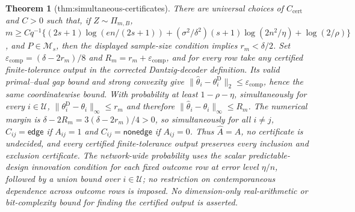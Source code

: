 \documentclass{article}
\newtheorem{theorem}{Theorem}
\begin{document}
\begin{theorem}[thm:simultaneous-certificates]\label{thm:simultaneous-certificates}
There are universal choices of \(C_{\mathrm{cert}}\) and \(C>0\) such that, if \(Z\sim\Pi_{m,B}\), \(m\ge Cq^{-1}\{(2s+1)\log(en/(2s+1))+(\sigma^2/\delta^2)(s+1)\log(2n^2/\eta)+\log(2/\rho)\}\), and \(P\in\mathcal M_s\), then the displayed sample-size condition implies \(r_m<\delta/2\). Set \(\varepsilon_{\mathrm{comp}}=(\delta-2r_m)/8\) and \(R_m=r_m+\varepsilon_{\mathrm{comp}}\), and for every row take any certified finite-tolerance output in the corrected Dantzig-decoder definition. Its valid primal--dual gap bound and strong convexity give \(\lVert\widehat\theta_i-\theta_i^{\mathrm D}\rVert_2\le\varepsilon_{\mathrm{comp}}\), hence the same coordinatewise bound. With probability at least \(1-\rho-\eta\), simultaneously for every \(i\in\mathcal U\), \(\lVert\theta_i^{\mathrm D}-\theta_i\rVert_\infty\le r_m\) and therefore \(\lVert\widehat\theta_i-\theta_i\rVert_\infty\le R_m\). The numerical margin is \(\delta-2R_m=3(\delta-2r_m)/4>0\), so simultaneously for all \(i\ne j\), \(C_{ij}=\mathsf{edge}\) if \(A_{ij}=1\) and \(C_{ij}=\mathsf{nonedge}\) if \(A_{ij}=0\). Thus \(\widehat A=A\), no certificate is undecided, and every certified finite-tolerance output preserves every inclusion and exclusion certificate. The network-wide probability uses the scalar predictable-design innovation condition for each fixed outcome row at error level \(\eta/n\), followed by a union bound over \(i\in\mathcal U\); no restriction on contemporaneous dependence across outcome rows is imposed. No dimension-only real-arithmetic or bit-complexity bound for finding the certified output is asserted.
\end{theorem}
\end{document}

